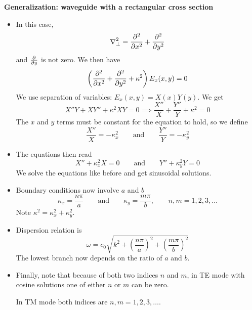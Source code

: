 \documentclass[11pt, a4paper]{article}
\newcommand{\eqtext}[1]{\qquad \text{#1} \qquad}
\renewcommand{\laplacian}{\nabla^{2}}
\begin{document}
\textbf{Generalization: waveguide with a rectangular cross section}
\begin{itemize}
	\item In this case,
	\begin{equation*}
		\laplacian_{\perp} = \pdv[2]{}{x} + \pdv[2]{}{y}
	\end{equation*}
	and $ \pdv{y} $ is not zero. We then have
	\begin{equation*}
		\left(\pdv[2]{}{x} + \pdv[2]{}{y} + \kappa^{2}\right)E_{x}(x, y) = 0
	\end{equation*}
	We use separation of variables: $ E_{x}(x, y) = X(x)Y(y) $. We get
	\begin{equation*}
		X''Y + XY'' + \kappa^{2}XY = 0 \implies \frac{X''}{X} + \frac{Y''}{Y} + \kappa^{2} = 0
	\end{equation*}
	The $ x $ and $ y $ terms must be constant for the equation to hold, so we define
	\begin{equation*}
		\frac{X''}{X} = - \kappa_{x}^{2} \eqtext{and} \frac{Y''}{Y} = - \kappa_{y}^{2}
	\end{equation*}
	
	\item The equations then read
	\begin{equation*}
		X'' + \kappa_{x}^{2}X = 0 \eqtext{and} 	Y'' + \kappa_{y}^{2}Y = 0
	\end{equation*}
	We solve the equations like before and get sinusoidal solutions. 
	
	\item Boundary conditions now involve $ a $ and $ b $
	\begin{equation*}
		\kappa_{x} = \frac{n\pi }{a}\eqtext{and} \kappa_{y} = \frac{m \pi}{b}, \qquad n, m = 1, 2, 3, \ldots
	\end{equation*}
	Note $ \kappa^{2} = \kappa_{x}^{2} + \kappa_{y}^{2} $.

	\item  Dispersion relation is
	\begin{equation*}
		\omega = c_{0} \sqrt{k^{2} + \left(\frac{n\pi}{a}\right)^{2} +  \left(\frac{m\pi}{b}\right)^{2}}
	\end{equation*}
	The lowest branch now depends on the ratio of $ a $ and $ b $. 
	
	\item Finally, note that because of both two indices $ n $ and $ m $, in TE mode with cosine solutions one of either $ n $ or $ m $ can be zero.
	
	In TM mode both indices are $ n, m = 1, 2, 3, \ldots $.
\end{itemize}
\end{document}
